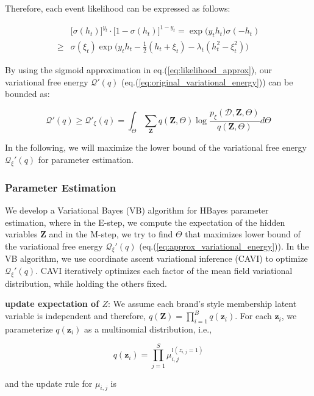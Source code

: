 Therefore, each event likelihood can be expressed as follows:

\begin{align}
\label{eq:likelihood_approx}
& \big[\sigma(h_t)\big]^{y_t} \cdot  \big[1-\sigma(h_t) \big]^{1-y_t} = \exp\big( y_t h_t \big) \sigma(-h_t) \nonumber \\
\geq & \sigma(\xi_t)\exp \big(y_t h_t-\frac{1}{2}(h_t+\xi_t)-\lambda_t(h_t^2-\xi_t^2) \big)
\end{align}

By using the sigmoid approximation in eq.(\ref{eq:likelihood_approx}), our variational free energy $\mathcal{Q}'(q)$ (eq.(\ref{eq:original_variational_energy})) can be bounded as:

\begin{equation}
\label{eq:approx_variational_energy}
\mathcal{Q}'(q) \geq \mathcal{Q}'_{\xi}(q) = \int_\Theta \sum_{\bm{Z}} q(\bm{Z},\Theta) \log\frac{p_{\xi}(\mathcal{D},\bm{Z},\Theta)}{q(\bm{Z},\Theta)}d\Theta
\end{equation}

In the following, we will maximize the lower bound of the variational free energy $\mathcal{Q}_{\xi}'(q) $ for parameter estimation.

\subsubsection{Parameter Estimation}
\label{sec:param}

We develop a Variational Bayes (VB) algorithm for HBayes parameter estimation, where in the E-step, we compute the expectation of the hidden variables $\mathbf{Z}$ and in the M-step, we try to find $\Theta$ that maximizes lower bound of the variational free energy $\mathcal{Q}_{\xi}'(q)$ (eq.(\ref{eq:approx_variational_energy})). In the VB algorithm, we use coordinate ascent variational inference (CAVI) \cite{bishop2006pattern} to optimize $\mathcal{Q}_{\xi}'(q)$. CAVI iteratively optimizes each factor of the mean field variational distribution, while holding the others fixed.

\noindent \textbf{update expectation of $Z$}:
We assume each brand's style membership latent variable is independent and therefore, $q(\mathbf{Z}) = \prod_{i=1}^B q(\mathbf{z}_i)$. For each $\mathbf{z}_i$, we parameterize $q(\mathbf{z}_i)$ as a multinomial distribution, i.e.,

$$q(\mathbf{z}_i) = \prod_{j=1}^S \mu_{i,j}^{\mathbb{I}(z_{i,j}=1)}$$

and the update rule for $\mu_{i,j}$ is  

